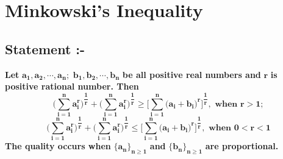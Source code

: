 \documentclass[12pt]{article}
\begin{document}
\pagebreak 


\section{Minkowski's Inequality}

\vspace*{2.5cm}

\subsection{Statement :-}


\Large{\textbf{Let }$\boldsymbol{a_{1}, a_{2}, \cdots, a_{n};}$ $\boldsymbol{b_{1}, b_{2}, \cdots, b_{n}}$\textbf{ be all positive real numbers and }$\boldsymbol{r}$\textbf{ is positive rational number. Then}}
\Large{\[\boldsymbol{
\Bigg(\sum_{i=1}^na_{i}^{r}\Bigg)^{\dfrac{1}{r}}+\Bigg(\sum_{i=1}^na_{i}^{r}\Bigg)^{\dfrac{1}{r}}
\geq\Bigg[\sum_{i=1}^n\big(a_{i}+b_i\big)^{r}\Bigg]^{\dfrac{1}{r}}, \textbf{ when } r>1; }\]
\[\boldsymbol{
\Bigg(\sum_{i=1}^na_{i}^{r}\Bigg)^{\dfrac{1}{r}}+\Bigg(\sum_{i=1}^na_{i}^{r}\Bigg)^{\dfrac{1}{r}}\leq\Bigg[\sum_{i=1}^n\big(a_{i}+b_i\big)^{r}\Bigg]^{\dfrac{1}{r}}, \textbf{ when } 0 <r<1}\]} \Large{\textbf{The quality occurs when }$\boldsymbol{\{a_n\}_{n\geq 1}}$\textbf{ and }$\boldsymbol{\{b_n\}_{n\geq 1}}$\textbf{ are proportional.}}
\end{document}
